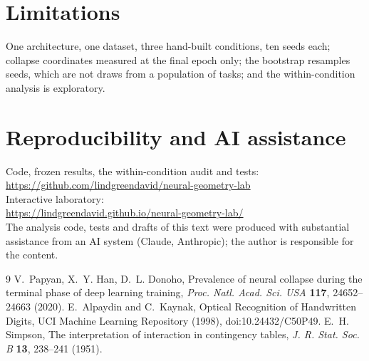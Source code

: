 \documentclass[11pt]{article}
\begin{document}
\section{Limitations}
One architecture, one dataset, three hand-built conditions, ten seeds each; collapse coordinates measured at the final epoch only;
the bootstrap resamples seeds, which are not draws from a population of tasks; and the within-condition analysis is exploratory.

\section*{Reproducibility and AI assistance}
Code, frozen results, the within-condition audit and tests:\\
\url{https://github.com/lindgreendavid/neural-geometry-lab}\\
Interactive laboratory:\\
\url{https://lindgreendavid.github.io/neural-geometry-lab/}\\
The analysis code, tests and drafts of this text were produced with substantial assistance from an AI system (Claude, Anthropic);
the author is responsible for the content.

\begin{thebibliography}{9}
 V.~Papyan, X.~Y. Han, D.~L. Donoho, Prevalence of neural collapse during the terminal phase of deep learning
training, \emph{Proc. Natl. Acad. Sci. USA} \textbf{117}, 24652--24663 (2020).
 E.~Alpaydin and C.~Kaynak, Optical Recognition of Handwritten Digits, UCI Machine Learning Repository (1998),
doi:10.24432/C50P49.
 E.~H. Simpson, The interpretation of interaction in contingency tables,
\emph{J. R. Stat. Soc. B} \textbf{13}, 238--241 (1951).
\end{thebibliography}
\end{document}
